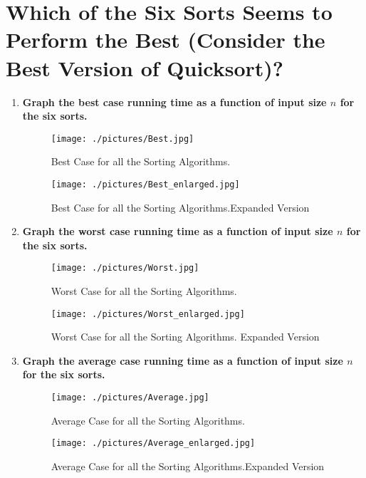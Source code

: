 \documentclass[a4paper,12pt]{article}
\begin{document}
	\section{Which of the Six Sorts Seems to Perform the Best (Consider the Best Version of Quicksort)?}
	\begin{enumerate}
		\item \textbf{Graph the best case running time as a function of input size $n$ for the six sorts.}
		\begin{figure}[h]
			\centering
			\texttt{[image: ./pictures/Best.jpg]}
			\caption{Best Case for all the Sorting Algorithms.}
		\end{figure}
		\clearpage
		\begin{figure}[h]
			\centering
			\texttt{[image: ./pictures/Best\_enlarged.jpg]}
			\caption{Best Case for all the Sorting Algorithms.Expanded Version}
		\end{figure}
		\item \textbf{Graph the worst case running time as a function of input size $n$ for the six sorts.}
		\begin{figure}[h]
			\centering
			\texttt{[image: ./pictures/Worst.jpg]}
			\caption{Worst Case for all the Sorting Algorithms.}
		\end{figure}
		\clearpage
		\begin{figure}[h]
			\centering
			\texttt{[image: ./pictures/Worst\_enlarged.jpg]}
			\caption{Worst Case for all the Sorting Algorithms. Expanded Version}
		\end{figure}
		\item \textbf{Graph the average case running time as a function of input size $n$ for the six sorts.}
		\begin{figure}[h]
			\centering
			\texttt{[image: ./pictures/Average.jpg]}
			\caption{Average Case for all the Sorting Algorithms.}
		\end{figure}
		\clearpage
		\begin{figure}[h]
			\centering
			\texttt{[image: ./pictures/Average\_enlarged.jpg]}
			\caption{Average Case for all the Sorting Algorithms.Expanded Version}
		\end{figure}
	\end{enumerate}
	
\end{document}
